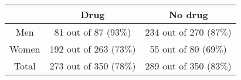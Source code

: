 \documentclass[standalone, version=2.0]{huangfusl-template}
\begin{document}
    \begin{tabular}{ccc}
        \toprule
        & Drug & No drug \\
        \midrule
        Men & 81 out of 87 ($93\%$) & 234 out of 270 ($87\%$) \\
        Women & 192 out of 263 ($73\%$) & 55 out of 80 ($69\%$) \\
        Total & 273 out of 350 ($78\%$) & 289 out of 350 ($83\%$) \\
        \bottomrule
    \end{tabular}
\end{document}
